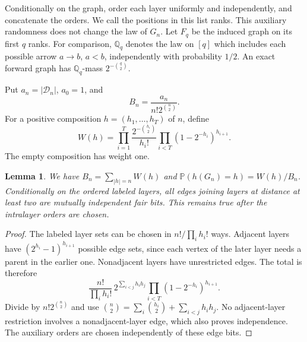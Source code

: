 \documentclass[11pt]{article}
\newtheorem{lemma}[theorem]{Lemma}
\theoremstyle{remark}
\newcommand{\Prob}{\mathbb P}
\newcommand{\D}{\mathcal D}
\newcommand{\Q}{\mathbb Q}
\begin{document}
Conditionally on the graph, order each layer uniformly and independently,
and concatenate the orders. We call the positions in this list ranks.
This auxiliary randomness does not change the law of $G_n$. Let $F_q$ be
the induced graph on its first $q$ ranks. For comparison, $\Q_q$ denotes
the law on $[q]$ which includes each possible arrow $a\to b$, $a<b$,
independently with probability $1/2$. An exact forward graph has $\Q_q$-mass
$2^{-\binom q2}$.

Put $a_n=|\D_n|$, $a_0=1$, and
\[
 B_n=\frac{a_n}{n!2^{\binom n2}}.
\]
For a positive composition $h=(h_1,\ldots,h_T)$ of $n$, define
\begin{equation}\label{eq:weight}
 W(h)=\prod_{i=1}^T\frac{2^{-\binom{h_i}{2}}}{h_i!}
       \prod_{i<T}(1-2^{-h_i})^{h_{i+1}}.
\end{equation}
The empty composition has weight one.

\begin{lemma}\label{lem:enumeration}
We have $B_n=\sum_{|h|=n}W(h)$ and
$\Prob(h(G_n)=h)=W(h)/B_n$. Conditionally on the ordered labeled layers,
all edges joining layers at distance at least two are mutually independent
fair bits. This remains true after the intralayer orders are chosen.
\end{lemma}
\begin{proof}
The labeled layer sets can be chosen in $n!/\prod_i h_i!$ ways.
Adjacent layers have $(2^{h_i}-1)^{h_{i+1}}$ possible edge sets, since
each vertex of the later layer needs a parent in the earlier one.
Nonadjacent layers have unrestricted edges. The total is therefore
\[
 \frac{n!}{\prod_i h_i!}\,2^{\sum_{i<j}h_i h_j}
 \prod_{i<T}(1-2^{-h_i})^{h_{i+1}}.
\]
Divide by $n!2^{\binom n2}$ and use
$\binom n2=\sum_i\binom{h_i}{2}+\sum_{i<j}h_i h_j$.
No adjacent-layer restriction involves a nonadjacent-layer edge, which also
proves independence. The auxiliary orders are chosen independently of these
edge bits.
\end{proof}
\end{document}

